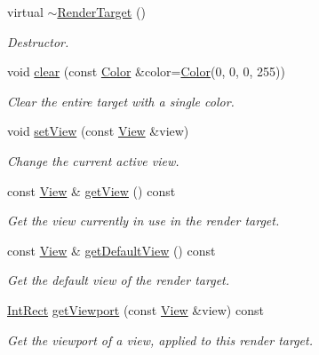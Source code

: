 \begin{DoxyCompactItemize}
\item 
\mbox{\label{classsf_1_1_render_target_a9abd1654a99fba46f6887b9c625b9b06}} 
virtual \hyperlink{classsf_1_1_render_target_a9abd1654a99fba46f6887b9c625b9b06}{$\sim$\+Render\+Target} ()
\begin{DoxyCompactList}\small\item\em Destructor. \end{DoxyCompactList}\item 
void \hyperlink{classsf_1_1_render_target_a6bb6f0ba348f2b1e2f46114aeaf60f26}{clear} (const \hyperlink{classsf_1_1_color}{Color} \&color=\hyperlink{classsf_1_1_color}{Color}(0, 0, 0, 255))
\begin{DoxyCompactList}\small\item\em Clear the entire target with a single color. \end{DoxyCompactList}\item 
void \hyperlink{classsf_1_1_render_target_a063db6dd0a14913504af30e50cb6d946}{set\+View} (const \hyperlink{classsf_1_1_view}{View} \&view)
\begin{DoxyCompactList}\small\item\em Change the current active view. \end{DoxyCompactList}\item 
const \hyperlink{classsf_1_1_view}{View} \& \hyperlink{classsf_1_1_render_target_a2c179503b4dcdf5282ef6426d317602c}{get\+View} () const
\begin{DoxyCompactList}\small\item\em Get the view currently in use in the render target. \end{DoxyCompactList}\item 
const \hyperlink{classsf_1_1_view}{View} \& \hyperlink{classsf_1_1_render_target_ad3b533c3f899d7044d981ed607aef9be}{get\+Default\+View} () const
\begin{DoxyCompactList}\small\item\em Get the default view of the render target. \end{DoxyCompactList}\item 
\hyperlink{classsf_1_1_rect}{Int\+Rect} \hyperlink{classsf_1_1_render_target_a865d462915dc2a1fae2ebfb3300382ac}{get\+Viewport} (const \hyperlink{classsf_1_1_view}{View} \&view) const
\begin{DoxyCompactList}\small\item\em Get the viewport of a view, applied to this render target. \end{DoxyCompactList}\item 

\end{DoxyCompactItemize}
